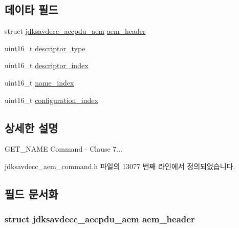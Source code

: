 \subsection*{데이타 필드}
\begin{DoxyCompactItemize}
\item 
struct \hyperlink{structjdksavdecc__aecpdu__aem}{jdksavdecc\+\_\+aecpdu\+\_\+aem} \hyperlink{structjdksavdecc__aem__command__get__name_ae1e77ccb75ff5021ad923221eab38294}{aem\+\_\+header}
\item 
uint16\+\_\+t \hyperlink{structjdksavdecc__aem__command__get__name_ab7c32b6c7131c13d4ea3b7ee2f09b78d}{descriptor\+\_\+type}
\item 
uint16\+\_\+t \hyperlink{structjdksavdecc__aem__command__get__name_a042bbc76d835b82d27c1932431ee38d4}{descriptor\+\_\+index}
\item 
uint16\+\_\+t \hyperlink{structjdksavdecc__aem__command__get__name_a898a74ada625e0b227dadb02901404e6}{name\+\_\+index}
\item 
uint16\+\_\+t \hyperlink{structjdksavdecc__aem__command__get__name_afaad1bd7c66f9611e134d8c5ce98f444}{configuration\+\_\+index}
\end{DoxyCompactItemize}


\subsection{상세한 설명}
G\+E\+T\+\_\+\+N\+A\+ME Command -\/ Clause 7... 

jdksavdecc\+\_\+aem\+\_\+command.\+h 파일의 13077 번째 라인에서 정의되었습니다.



\subsection{필드 문서화}
\subsubsection[{\texorpdfstring{aem\+\_\+header}{aem_header}}]{\setlength{\rightskip}{0pt plus 5cm}struct {\bf jdksavdecc\+\_\+aecpdu\+\_\+aem} aem\+\_\+header}\hypertarget{structjdksavdecc__aem__command__get__name_ae1e77ccb75ff5021ad923221eab38294}{}\label{structjdksavdecc__aem__command__get__name_ae1e77ccb75ff5021ad923221eab38294}


